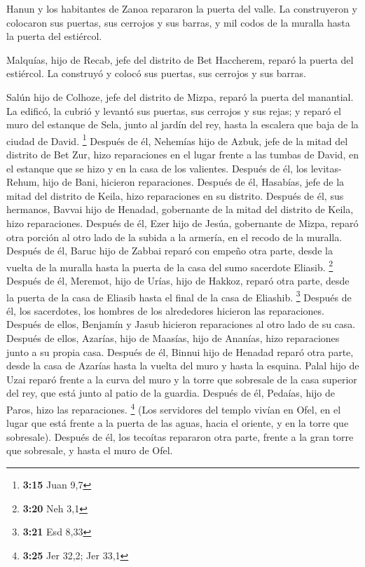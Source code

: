 \begin{paracol}{2}
 Hanun y los habitantes de Zanoa repararon la puerta del
valle. La construyeron y colocaron sus puertas, sus cerrojos y sus
barras, y mil codos de la muralla hasta la puerta del estiércol.

 Malquías, hijo de Recab, jefe del distrito de Bet
Haccherem, reparó la puerta del estiércol. La construyó y colocó sus
puertas, sus cerrojos y sus barras.

 Salún hijo de Colhoze, jefe del distrito de Mizpa,
reparó la puerta del manantial. La edificó, la cubrió y levantó sus
puertas, sus cerrojos y sus rejas; y reparó el muro del estanque de
Sela, junto al jardín del rey, hasta la escalera que baja de la ciudad
de David. \footnote{\textbf{3:15} Juan 9,7}  Después de
él, Nehemías hijo de Azbuk, jefe de la mitad del distrito de Bet Zur,
hizo reparaciones en el lugar frente a las tumbas de David, en el
estanque que se hizo y en la casa de los valientes. 
Después de él, los levitas-Rehum, hijo de Bani, hicieron reparaciones.
Después de él, Hasabías, jefe de la mitad del distrito de Keila, hizo
reparaciones en su distrito.  Después de él, sus
hermanos, Bavvai hijo de Henadad, gobernante de la mitad del distrito de
Keila, hizo reparaciones.  Después de él, Ezer hijo de
Jesúa, gobernante de Mizpa, reparó otra porción al otro lado de la
subida a la armería, en el recodo de la muralla.  Después
de él, Baruc hijo de Zabbai reparó con empeño otra parte, desde la
vuelta de la muralla hasta la puerta de la casa del sumo sacerdote
Eliasib. \footnote{\textbf{3:20} Neh 3,1}  Después de él,
Meremot, hijo de Urías, hijo de Hakkoz, reparó otra parte, desde la
puerta de la casa de Eliasib hasta el final de la casa de Eliashib.
\footnote{\textbf{3:21} Esd 8,33}  Después de él, los
sacerdotes, los hombres de los alrededores hicieron las reparaciones.
 Después de ellos, Benjamín y Jasub hicieron reparaciones
al otro lado de su casa. Después de ellos, Azarías, hijo de Maasías,
hijo de Ananías, hizo reparaciones junto a su propia casa.
 Después de él, Binnui hijo de Henadad reparó otra parte,
desde la casa de Azarías hasta la vuelta del muro y hasta la esquina.
 Palal hijo de Uzai reparó frente a la curva del muro y
la torre que sobresale de la casa superior del rey, que está junto al
patio de la guardia. Después de él, Pedaías, hijo de Paros, hizo las
reparaciones. \footnote{\textbf{3:25} Jer 32,2; Jer 33,1}
 (Los servidores del templo vivían en Ofel, en el lugar
que está frente a la puerta de las aguas, hacia el oriente, y en la
torre que sobresale).  Después de él, los tecoítas
repararon otra parte, frente a la gran torre que sobresale, y hasta el
muro de Ofel.


\end{paracol}
